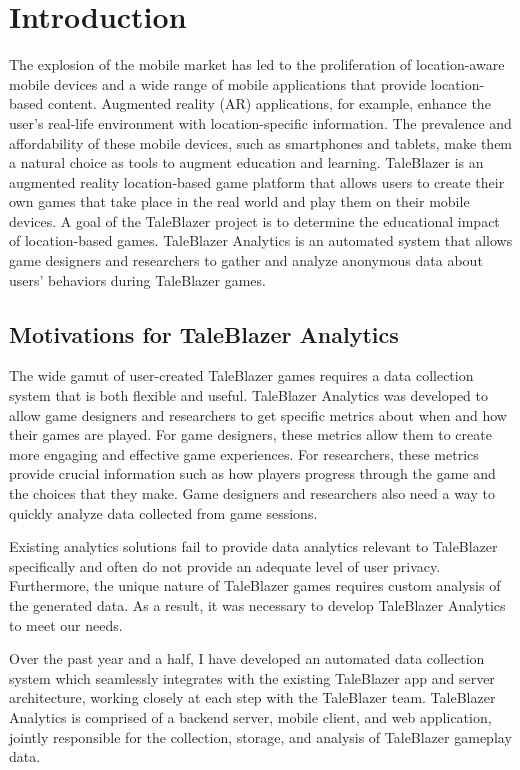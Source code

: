 \chapter{Introduction}

The explosion of the mobile market has led to the proliferation of location-aware mobile devices and a wide range of mobile applications that provide location-based content. Augmented reality (AR) applications, for example, enhance the user's real-life environment with location-specific information. The prevalence and affordability of these mobile devices, such as smartphones and tablets, make them a natural choice as tools to augment education and learning. TaleBlazer is an augmented reality location-based game platform that allows users to create their own games that take place in the real world and play them on their mobile devices. A goal of the TaleBlazer project is to determine the educational impact of location-based games. TaleBlazer Analytics is an automated system that allows game designers and researchers to gather and analyze anonymous data about users' behaviors during TaleBlazer games. 

\section{Motivations for TaleBlazer Analytics}
The wide gamut of user-created TaleBlazer games requires a data collection system that is both flexible and useful. TaleBlazer Analytics was developed to allow game designers and researchers to get specific metrics about when and how their games are played. For game designers, these metrics allow them to create more engaging and effective game experiences. For researchers, these metrics provide crucial information such as how players progress through the game and the choices that they make. Game designers and researchers also need a way to quickly analyze data collected from game sessions.

Existing analytics solutions fail to provide data analytics relevant to TaleBlazer specifically and often do not provide an adequate level of user privacy. Furthermore, the unique nature of TaleBlazer games requires custom analysis of the generated data. As a result, it was necessary to develop TaleBlazer Analytics to meet our needs. 

Over the past year and a half, I have developed an automated data collection system which seamlessly integrates with the existing TaleBlazer app and server architecture, working closely at each step with the TaleBlazer team. TaleBlazer Analytics is comprised of a backend server, mobile client, and web application, jointly responsible for the collection, storage, and analysis of TaleBlazer gameplay data. 

